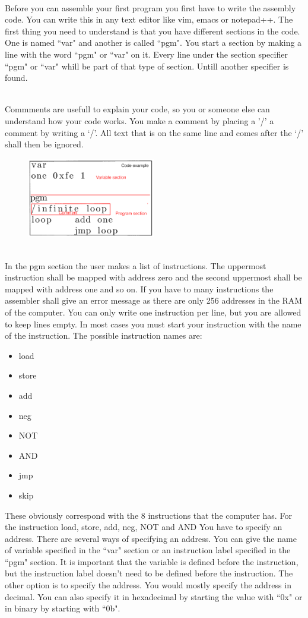 \documentclass{article}
\begin{document}
~\\
Before you can assemble your first program you first have to write the assembly code. You can write this in any text editor like vim, emacs or notepad++. The first thing you need to understand is that you have different sections in the code. One is named ``var" and another is called ``pgm". You start a section by making a line with the word ``pgm" or ``var" on it. Every line under the section specifier ``pgm" or ``var" whill be part of that type of section. Untill another specifier is found.

~\\
Commments are usefull to explain your code, so you or someone else can understand how your code works. You make a comment by placing a '/' a comment by writing a ‘/’. All text that is on the same line and comes after the ‘/’ shall then be ignored.
\begin{figure}[H]
	\includegraphics[width=0.5\textwidth]{Comments and sections.png}
\end{figure}
~\\
In the pgm section the user makes a list of instructions. The uppermost instruction shall be mapped with address zero and the second uppermost shall be mapped with address one and so on. If you have to many instructions the assembler shall give an error message as there are only 256 addresses in the RAM of the computer. You can only write one instruction per line, but you are allowed to keep lines empty. In most cases you must start your instruction with the name of the instruction. The possible instruction names are:
\begin{itemize}
	\item{load}
	\item{store}
	\item{add}
	\item{neg}
	\item{NOT}
	\item{AND}
	\item{jmp}
	\item{skip}
\end{itemize}
These obviously correspond with the 8 instructions that the computer has. For the instruction load, store, add, neg, NOT and AND You have to specify an address. There are several ways of specifying an address. You can give the name of variable specified in the ``var" section or an instruction label specified in the ``pgm" section. It is important that the variable is defined before the instruction, but the instruction label doesn't need to be defined before the instruction. The other option is to specify the address. You would mostly specify the address in decimal. You can also specify it in hexadecimal by starting the value with  ``0x" or in binary by starting with ``0b".
\end{document}
